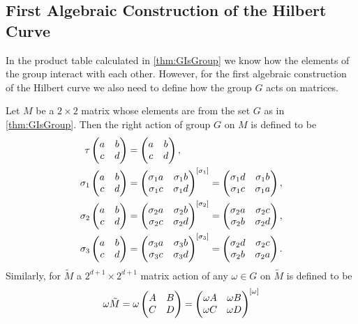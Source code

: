 \documentclass[12pt]{article}
\begin{document}
\subsection*{First Algebraic Construction of the Hilbert Curve}
In the product table calculated in \autoref{thm:GIsGroup} we know how the elements of the group interact with each other. However, for the first algebraic construction of the Hilbert curve we also need to define how the group $ G $ acts on matrices.
\begin{definition}
	\label{def:RightactionOFgroup}
	Let $ M $ be a $2\times 2$ matrix whose elements are from the set $ G $ as in \autoref{thm:GIsGroup}. Then the right action of group $ G $ on $ M $ is defined to be
	\begin{align*}
		\tau \begin{pmatrix} a & b \\ c & d \end{pmatrix} &= \begin{pmatrix} a & b \\ c & d \end{pmatrix},\\
		\sigma_1 \begin{pmatrix} a & b \\ c & d \end{pmatrix} &= \begin{pmatrix} \sigma_1a & \sigma_1b \\ \sigma_1c & \sigma_1d \end{pmatrix}^{[\sigma_1]} = \begin{pmatrix} \sigma_1 d & \sigma_1 b \\ \sigma_1 c & \sigma_1 a \end{pmatrix},\\
		\sigma_2 \begin{pmatrix} a & b \\ c & d \end{pmatrix} &= \begin{pmatrix} \sigma_2a & \sigma_2b \\ \sigma_2c & \sigma_2d \end{pmatrix}^{[\sigma_2]} = \begin{pmatrix} \sigma_2 a & \sigma_2 c \\ \sigma_2 b & \sigma_2 d \end{pmatrix},\\
		\sigma_3 \begin{pmatrix} a & b \\ c & d \end{pmatrix} &= \begin{pmatrix} \sigma_3a & \sigma_3b \\ \sigma_3c & \sigma_3d \end{pmatrix}^{[\sigma_3]} = \begin{pmatrix} \sigma_2 d & \sigma_2 c \\ \sigma_2 b & \sigma_2 a \end{pmatrix}.\\
	\end{align*}
	Similarly, for $ \tilde{M} $ a $ 2^{d+1}\times 2^{d+1} $ matrix action of any $ \omega \in G $ on $ \tilde{M} $ is defined to be
	\[ \omega \tilde{M} = \omega \begin{pmatrix} A & B \\ C & D \end{pmatrix} = \begin{pmatrix} \omega A & \omega B \\ \omega C & \omega D \end{pmatrix}^{[\omega ]}\]
\end{definition}
\end{document}
